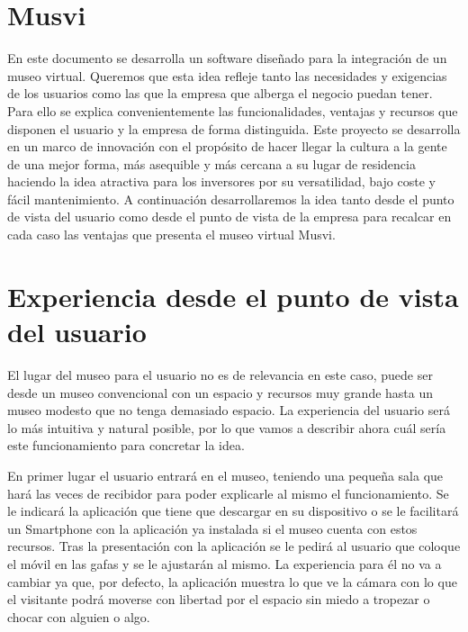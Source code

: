 \documentclass[a4paper,11pt]{article}
\begin{document}
\newpage

\tableofcontents

\newpage

\section{Musvi}
En este documento se desarrolla un software diseñado para la integración de un museo virtual. Queremos que esta idea refleje tanto las necesidades y exigencias de los usuarios como las que la empresa que alberga el negocio puedan tener. Para ello se explica convenientemente las funcionalidades, ventajas y recursos que disponen el usuario y la empresa de forma distinguida. Este proyecto se desarrolla en un marco de innovación con el propósito de hacer llegar la cultura a la gente de una mejor forma, más asequible y más cercana a su lugar de residencia haciendo la idea atractiva para los inversores por su versatilidad, bajo coste y fácil mantenimiento. A continuación desarrollaremos la idea tanto desde el punto de vista del usuario como desde el punto de vista de la empresa para recalcar en cada caso las ventajas que presenta el museo virtual Musvi.

\section{Experiencia desde el punto de vista del usuario}
El lugar del museo para el usuario no es de relevancia en este caso, puede ser desde un museo convencional con un espacio y recursos muy grande hasta un museo modesto que no tenga demasiado espacio. La experiencia del usuario será lo más intuitiva y natural posible, por lo que vamos a describir ahora cuál sería este funcionamiento para concretar la idea.

\vspace{10px}

En primer lugar el usuario entrará en el museo, teniendo una pequeña sala que hará las veces de recibidor para poder explicarle al mismo el funcionamiento. Se le indicará la aplicación que tiene que descargar en su dispositivo o se le facilitará un Smartphone con la aplicación ya instalada si el museo cuenta con estos recursos. Tras la presentación con la aplicación se le pedirá al usuario que coloque el móvil en las gafas y se le ajustarán al mismo. La experiencia para él no va a cambiar ya que, por defecto, la aplicación muestra lo que ve la cámara con lo que el visitante podrá moverse con libertad por el espacio sin miedo a tropezar o chocar con alguien o algo.
\end{document}
